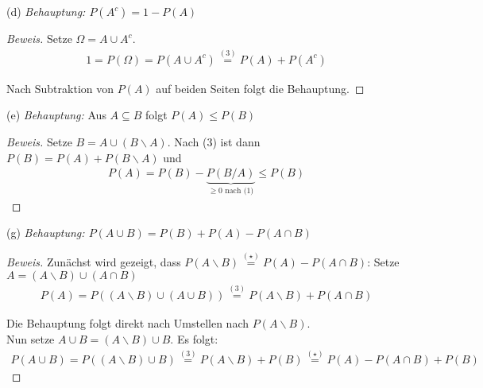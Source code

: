 \documentclass[10pt]{article}
\begin{document}
(d) \textit{Behauptung: $P(A^c) = 1 - P(A)$}
\begin{proof}[Beweis]
Setze $\Omega = A \cup A^c$. 
\begin{align*}
    1 = P(\Omega) = P(A \cup A^c) \stackrel{(3)}{=} P(A) + P(A^c)
\end{align*}

Nach Subtraktion von $P(A)$ auf beiden Seiten folgt die Behauptung.

\end{proof}

(e) \textit{Behauptung: } Aus $A \subseteq B$ folgt $P(A) \leq P(B)$
\begin{proof}[Beweis]
Setze $B = A \cup (B\backslash A)$. Nach (3) ist dann $P(B) = P(A) + P(B\backslash A)$ und 
\begin{align*}
    P(A) = P(B) - \underbrace{P(B/A)}_\text{$\geq 0$ nach (1)} \leq P(B)
\end{align*}

\end{proof}

(g) \textit{Behauptung: $P(A \cup B) = P(B) + P(A) - P(A \cap B)$}
\begin{proof}[Beweis]
Zunächst wird gezeigt, dass $P(A\backslash B) \stackrel{(\star)}{=} P(A) - P(A \cap B)$: Setze $A = (A\backslash B) \cup (A \cap B)$
\begin{align*}
    P(A) = P((A\backslash B)\cup(A \cup B)) \stackrel{(3)}{=} P(A\backslash B) + P(A\cap B)
\end{align*}

Die Behauptung folgt direkt nach Umstellen nach $P(A\backslash B)$. \\
Nun setze $A\cup B = (A\backslash B) \cup B$. Es folgt: 
\begin{align*}
    P(A \cup B) = P((A\backslash B) \cup B) \stackrel{(3)}{=} P(A\backslash B) + P(B) \stackrel{(\star)}{=} P(A) - P(A \cap B) + P(B)
\end{align*}

\end{proof}
\end{document}
